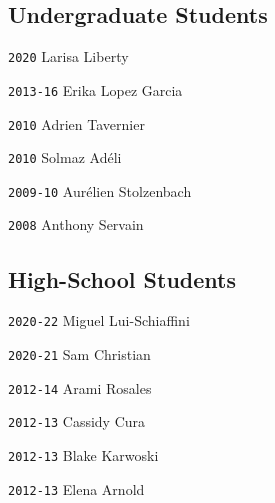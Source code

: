 \newpage
\begin{multicols}{2}

\vspace{-1em}
\subsection*{Undergraduate Students}

\noindent \texttt{2020} \tab Larisa Liberty

\noindent \texttt{2013-16} \tab Erika Lopez Garcia

\noindent \texttt{2010} \tab Adrien Tavernier

\noindent \texttt{2010} \tab Solmaz Adéli

\noindent \texttt{2009-10} \tab Aurélien Stolzenbach

\noindent \texttt{2008} \tab Anthony Servain

\columnbreak
\vspace{-1em}
\subsection*{High-School Students}

\noindent \texttt{2020-22} \tab Miguel Lui-Schiaffini

\noindent \texttt{2020-21} \tab Sam Christian

\noindent \texttt{2012-14} \tab Arami Rosales

\noindent \texttt{2012-13} \tab Cassidy Cura

\noindent \texttt{2012-13} \tab Blake Karwoski

\noindent \texttt{2012-13} \tab Elena Arnold

\end{multicols}